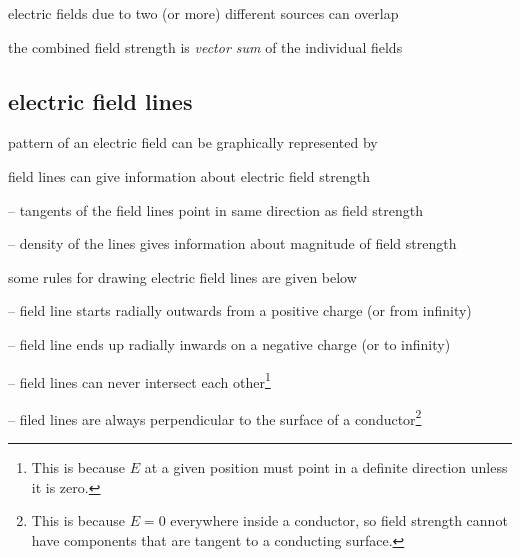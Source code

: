 \cmt  electric fields due to two (or more) different sources can overlap

the combined field strength is \emph{vector sum} of the individual fields

%





\subsection{electric field lines}

pattern of an electric field can be graphically represented by 

\cmt field lines can give information about electric field strength

\begin{compactitem}
	\item[--] tangents of the field lines point in same direction as field strength
	
	\item[--] density of the lines gives information about magnitude of field strength
\end{compactitem}

\cmt some rules for drawing electric field lines are given below

\begin{compactitem}
	\item[--] field line starts radially outwards from a positive charge (or from infinity)
	
	\item[--] field line ends up radially inwards on a negative charge (or to infinity)
	
	\item[--] field lines can never intersect each other\footnote{This is because $E$ at a given position must point in a definite direction unless it is zero.}
	
	\item[--] filed lines are always perpendicular to the surface of a conductor\footnote{This is because $E=0$ everywhere inside a conductor, so field strength cannot have components that are tangent to a conducting surface.}
\end{compactitem}




